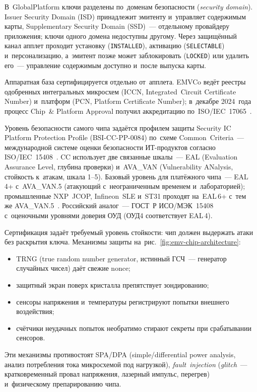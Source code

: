 В~GlobalPlatform ключи разделены по~доменам безопасности (\textit{security
domain}). Issuer Security Domain (ISD) принадлежит эмитенту и~управляет
содержимым карты, Supplementary Security Domain (SSD)~--- отдельному провайдеру
приложения; ключи одного домена недоступны другому. Через защищённый канал
апплет проходит установку
(\texttt{INSTALLED}), активацию (\texttt{SELECTABLE}) и~персонализацию,
а~эмитент позже может заблокировать (\texttt{LOCKED}) или удалить его~---
управление содержимым доступно и~после выпуска карты.

Аппаратная база сертифицируется отдельно от~апплета. EMVCo ведёт реестры
одобренных интегральных микросхем (ICCN, Integrated~Circuit Certificate Number)
и~платформ (PCN, Platform Certificate Number); в~декабре 2024~года процесс Chip~\&
Platform Approval получил аккредитацию по~ISO/IEC~17065~\cite{emvco-cpa,emvco-iso17065-accreditation-2024}.

Уровень безопасности самого чипа задаётся профилем защиты Security IC Platform
Protection Profile (BSI-CC-PP-0084) по~схеме Common~Criteria~--- международной
системе оценки безопасности ИТ-продуктов согласно
ISO/IEC~15408~\cite{cc-pp-0084}. CC использует две связанные шкалы~--- EAL
(Evaluation Assurance Level, глубина проверки) и~AVA\_VAN (Vulnerability
ANalysis, стойкость к~атакам, шкала 1--5). Базовый уровень для платёжного
чипа~--- EAL\,4+ с~AVA\_VAN.5 (атакующий с~неограниченным временем
и~лабораторией); промышленные NXP~JCOP, Infineon~SLE и~ST31 проходят на~EAL\,6+
с~тем же AVA\_VAN.5~\cite{nxp-jcop4-emv}. Российский аналог~--- ГОСТ~Р
ИСО/МЭК~15408 с~оценочными уровнями доверия ОУД (ОУД4 соответствует EAL\,4).

Сертификация задаёт требуемый уровень стойкости: чип должен выдержать атаки
без раскрытия ключа. Механизмы защиты на~рис.~\ref{fig:emv-chip-architecture}:

\begin{itemize}
  \item TRNG (true random number generator, истинный ГСЧ~--- генератор
    случайных чисел) даёт свежие nonce;
  \item защитный экран поверх кристалла препятствует зондированию;
  \item сенсоры напряжения и~температуры регистрируют попытки внешнего
    воздействия;
  \item счётчики неудачных попыток необратимо стирают секреты при срабатывании
    сенсоров.
\end{itemize}

Эти механизмы противостоят SPA/DPA (simple/differential power analysis, анализ
потребления тока микросхемой под нагрузкой), \textit{fault~injection}
(\textit{glitch}~--- кратковременный провал напряжения, лазерный импульс,
перегрев) и~физическому препарированию чипа.

